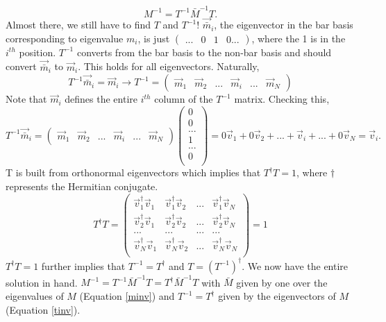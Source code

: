 \documentclass[12pt]{article}
\begin{document}
\begin{equation}
M^{-1} = T^{-1}\bar{M}^{-1}T.   
\end{equation}
Almost there, we still have to find $T$ and $T^{-1}$! $\vec{\bar{m}}_{i}$, the eigenvector in the bar basis corresponding to eigenvalue $m_i$, is just $\begin{pmatrix}... & 0 & 1 & 0 ... \end{pmatrix}$, where the 1 is in the $i^{th}$ position. $T^{-1}$ converts from the bar basis to the non-bar basis and should convert $\vec{\bar{m}}_{i}$ to $\vec{m}_{i}$. This holds for all eigenvectors. Naturally,
\begin{equation}
\label{tinv}
T^{-1}\vec{\bar{m}}_{i} = \vec{m}_{i} \rightarrow T^{-1} = 
\left( \begin{array}{c|c|c|c|c|c}
   \vec{m}_1 & \vec{m}_2 & ... & \vec{m}_i & ... & \vec{m}_N 
\end{array}\right)
\end{equation} 
Note that $\vec{m}_i$ defines the entire $i^{th}$ column of the $T^{-1}$ matrix. Checking this,
\begin{equation}
T^{-1}\vec{\bar{m}}_{i} = 
\left( \begin{array}{c|c|c|c|c|c}
   \vec{m}_1 & \vec{m}_2 & ... & \vec{m}_i & ... & \vec{m}_N 
\end{array}\right)
\begin{pmatrix}
0 \\ 0 \\ ... \\ 1 \\ ... \\ 0 \\ 
\end{pmatrix}
= 0\vec{v}_{1} + 0 \vec{v}_{2} + ... + \vec{v}_{i} + ... + 0\vec{v}_{N} = \vec{v}_{i}.
\end{equation} 
T is built from orthonormal eigenvectors which implies that $T^{\dagger}T = 1$, where $\dagger$ represents the Hermitian conjugate. 
\begin{equation}
T^{\dagger}T =  
\begin{pmatrix}
\vec{v}_1^\dagger \vec{v}_1 & \vec{v}_1^\dagger \vec{v}_2 & ... & \vec{v}_1^\dagger \vec{v}_N \\
\vec{v}_2^\dagger \vec{v}_1 & \vec{v}_2^\dagger \vec{v}_2 & ... & \vec{v}_2^\dagger \vec{v}_N \\
... & ... & ... & ... \\
\vec{v}_N^\dagger \vec{v}_1 & \vec{v}_N^\dagger \vec{v}_2 & ... & \vec{v}_N^\dagger \vec{v}_N \\
\end{pmatrix}
= 1
\end{equation}
$T^{\dagger}T = 1$ further implies that $T^{-1} = T^{\dagger}$ and $T = (T^{-1})^{\dagger}$. We now have the entire solution in hand. $M^{-1} = T^{-1}\bar{M}^{-1}T = T^{\dagger}\bar{M}^{-1}T$ with $\bar{M}$ given by one over the eigenvalues of $M$ (Equation \ref{minv}) and $T^{-1} = T^\dagger$ given by the eigenvectors of $M$ (Equation \ref{tinv}).
\end{document}
